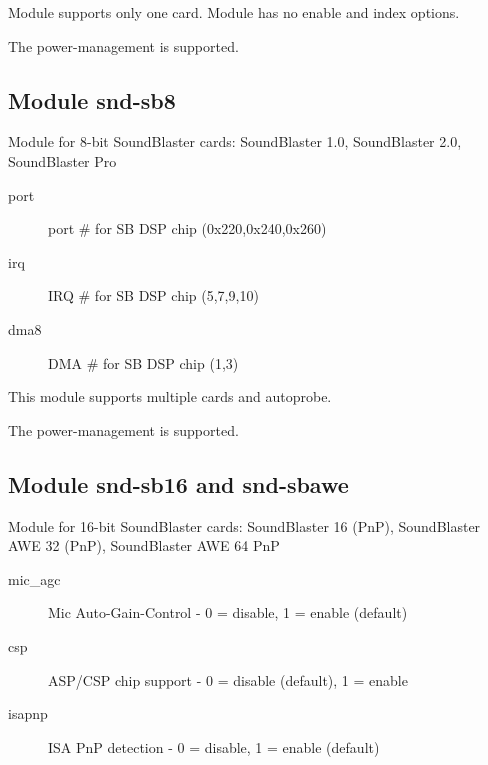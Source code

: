 \documentclass[a4paper,8pt,english]{sphinxmanual}
\begin{document}
Module supports only one card.
Module has no enable and index options.

The power-management is supported.


\subsection{Module snd-sb8}
\label{sound/alsa-configuration:module-snd-sb8}
Module for 8-bit SoundBlaster cards: SoundBlaster 1.0, SoundBlaster 2.0,
SoundBlaster Pro
\begin{description}
\item[{port}] \leavevmode
port \# for SB DSP chip (0x220,0x240,0x260)

\item[{irq}] \leavevmode
IRQ \# for SB DSP chip (5,7,9,10)

\item[{dma8}] \leavevmode
DMA \# for SB DSP chip (1,3)

\end{description}

This module supports multiple cards and autoprobe.

The power-management is supported.


\subsection{Module snd-sb16 and snd-sbawe}
\label{sound/alsa-configuration:module-snd-sb16-and-snd-sbawe}
Module for 16-bit SoundBlaster cards: SoundBlaster 16 (PnP),
SoundBlaster AWE 32 (PnP), SoundBlaster AWE 64 PnP
\begin{description}
\item[{mic\_agc}] \leavevmode
Mic Auto-Gain-Control - 0 = disable, 1 = enable (default)

\item[{csp}] \leavevmode
ASP/CSP chip support - 0 = disable (default), 1 = enable

\item[{isapnp}] \leavevmode
ISA PnP detection - 0 = disable, 1 = enable (default)

\end{description}
\end{document}

